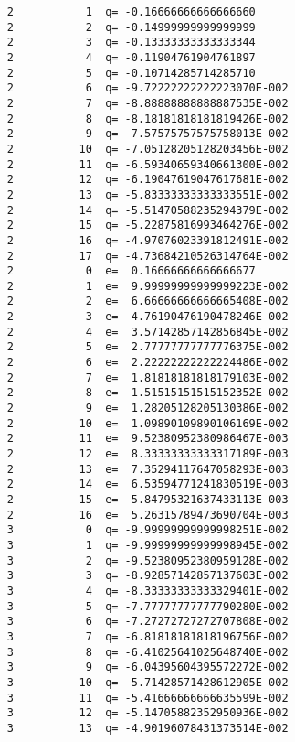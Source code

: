 \documentclass{article}
\begin{document}
\begin{verbatim}
           2           1  q= -0.16666666666666660     
           2           2  q= -0.14999999999999999     
           2           3  q= -0.13333333333333344     
           2           4  q= -0.11904761904761897     
           2           5  q= -0.10714285714285710     
           2           6  q= -9.72222222222223070E-002
           2           7  q= -8.88888888888887535E-002
           2           8  q= -8.18181818181819426E-002
           2           9  q= -7.57575757575758013E-002
           2          10  q= -7.05128205128203456E-002
           2          11  q= -6.59340659340661300E-002
           2          12  q= -6.19047619047617681E-002
           2          13  q= -5.83333333333333551E-002
           2          14  q= -5.51470588235294379E-002
           2          15  q= -5.22875816993464276E-002
           2          16  q= -4.97076023391812491E-002
           2          17  q= -4.73684210526314764E-002
           2           0  e=  0.16666666666666677     
           2           1  e=  9.99999999999999223E-002
           2           2  e=  6.66666666666665408E-002
           2           3  e=  4.76190476190478246E-002
           2           4  e=  3.57142857142856845E-002
           2           5  e=  2.77777777777776375E-002
           2           6  e=  2.22222222222224486E-002
           2           7  e=  1.81818181818179103E-002
           2           8  e=  1.51515151515152352E-002
           2           9  e=  1.28205128205130386E-002
           2          10  e=  1.09890109890106169E-002
           2          11  e=  9.52380952380986467E-003
           2          12  e=  8.33333333333317189E-003
           2          13  e=  7.35294117647058293E-003
           2          14  e=  6.53594771241830519E-003
           2          15  e=  5.84795321637433113E-003
           2          16  e=  5.26315789473690704E-003
           3           0  q= -9.99999999999998251E-002
           3           1  q= -9.99999999999998945E-002
           3           2  q= -9.52380952380959128E-002
           3           3  q= -8.92857142857137603E-002
           3           4  q= -8.33333333333329401E-002
           3           5  q= -7.77777777777790280E-002
           3           6  q= -7.27272727272707808E-002
           3           7  q= -6.81818181818196756E-002
           3           8  q= -6.41025641025648740E-002
           3           9  q= -6.04395604395572272E-002
           3          10  q= -5.71428571428612905E-002
           3          11  q= -5.41666666666635599E-002
           3          12  q= -5.14705882352950936E-002
           3          13  q= -4.90196078431373514E-002

\end{verbatim}
\end{document}
